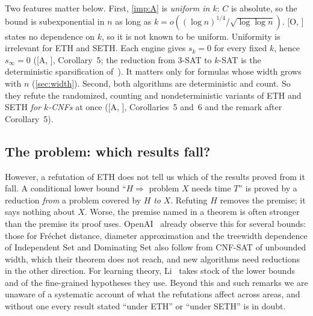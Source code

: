 \documentclass[10pt]{amsart}
\theoremstyle{plain}
\theoremstyle{definition}
\theoremstyle{remark}
\numberwithin{equation}{section}
\newcommand{\A}[1][]{\textup{[A\if\relax\detokenize{#1}\relax\else, #1\fi]}}
\newcommand{\Oa}[1][]{\textup{[O\if\relax\detokenize{#1}\relax\else, #1\fi]}}
\begin{document}
Two features matter below. First, \cref{imp:A} is \emph{uniform in $k$}: $C$ is absolute, so the
bound is subexponential in $n$ as long as $k=o((\log n)^{1/4}/\sqrt{\log\log n})$. \Oa{} states
no dependence on $k$, so it is not known to be uniform. Uniformity is irrelevant for ETH and SETH.
Each engine gives $s_k=0$ for every fixed $k$, hence $s_\infty=0$ (\A, Corollary~5; the reduction
from $3$-SAT to $k$-SAT is the deterministic sparsification of~\cite{IPZ01}). It matters only for
formulas whose width grows with $n$ (\cref{sec:width}). Second, both algorithms are deterministic
and count. So they refute the randomized, counting and nondeterministic variants of ETH and SETH
\emph{for $k$-CNFs} at once (\A, Corollaries~5 and~6 and the remark after Corollary~5).

\subsection{The problem: which results fall?}
However, a refutation of ETH does not tell us which of the results proved from it fall. A
conditional lower bound ``$H\Rightarrow$ problem $X$ needs time $T$'' is proved by a reduction
\emph{from} a problem covered by $H$ \emph{to} $X$. Refuting $H$ removes the premise; it says
nothing about $X$. Worse, the premise named in a theorem is often stronger than the premise its
proof uses. OpenAI~\cite[\S1.1.3]{OpenAI26} already observe this for several bounds: those for
Fr\'echet distance, diameter approximation and the treewidth dependence of Independent Set and
Dominating Set also follow from CNF-SAT of unbounded width, which their theorem does not reach, and
new algorithms need reductions in the other direction. For learning theory, Li~\cite[\S6]{Li26}
takes stock of the lower bounds and of the fine-grained hypotheses they use. Beyond this and such
remarks we are unaware of a systematic account of what the refutations affect across areas, and
without one every result stated ``under ETH'' or ``under SETH'' is in doubt.
\end{document}
